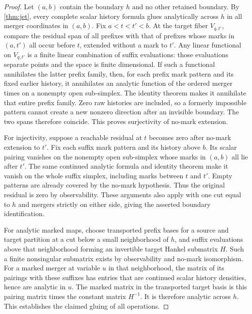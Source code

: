 \documentclass[11pt]{article}
\begin{document}
\begin{proof}
Let $(a,b)$ contain the boundary $h$ and no other retained boundary.  By \cref{thm:jet}, every complete scalar history formula glues analytically across $h$ in all merger coordinates in $(a,b)$.  Fix $a<t<t'<b$.  At the target fiber $V_{q,t'}$, compare the residual span of all prefixes with that of prefixes whose marks in $(a,t')$ all occur before $t$, extended without a mark to $t'$.  Any linear functional on $V_{q,t'}$ is a finite linear combination of suffix evaluations: those evaluations separate points and the space is finite dimensional.  If such a functional annihilates the latter prefix family, then, for each prefix mark pattern and its fixed earlier history, it annihilates an analytic function of the ordered merger times on a nonempty open sub-simplex.  The identity theorem makes it annihilate that entire prefix family.  Zero raw histories are included, so a formerly impossible pattern cannot create a new nonzero direction after an invisible boundary.  The two spans therefore coincide.  This proves surjectivity of no-mark extension.

For injectivity, suppose a reachable residual at $t$ becomes zero after no-mark extension to $t'$.  Fix each suffix mark pattern and its history above $b$.  Its scalar pairing vanishes on the nonempty open sub-simplex whose marks in $(a,b)$ all lie after $t'$.  The same continued analytic formula and identity theorem make it vanish on the whole suffix simplex, including marks between $t$ and $t'$.  Empty patterns are already covered by the no-mark hypothesis.  Thus the original residual is zero by observability.  These arguments also apply with one cut equal to $h$ and mergers strictly on either side, giving the asserted boundary identification.

For analytic marked maps, choose transported prefix bases for a source and target partition at a cut below a small neighborhood of $h$, and suffix evaluations above that neighborhood forming an invertible target Hankel submatrix $H$.  Such a finite nonsingular submatrix exists by observability and no-mark isomorphism.  For a marked merger at variable $u$ in that neighborhood, the matrix of its pairings with these suffixes has entries that are continued scalar history densities, hence are analytic in $u$.  The marked matrix in the transported target basis is this pairing matrix times the constant matrix $H^{-1}$.  It is therefore analytic across $h$.  This establishes the claimed gluing of all operations.
\end{proof}
\end{document}

